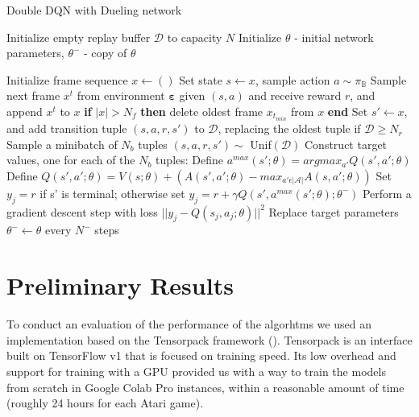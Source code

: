 \documentclass{article}
\begin{document}
\begin{algorithm}[ht]
\caption{Double DQN with Dueling network}\label{alg:double}
\begin{algorithmic}[2]
    \State Initialize empty replay buffer $\mathcal{D}$ to capacity $N$
    \State Initialize $\theta$ - initial network parameters, $\theta^{-}$ - copy of $\theta$

        \State Initialize frame sequence $x \gets ()$ 
            \State Set state $s \gets x$, sample action $a \sim \pi_{\mathbb{B}}$
            \State Sample next frame $x^{t}$ from environment $\mathbf{\varepsilon}$
            given $(s,a)$ and receive reward $r$, and append $x^{t}$ to $x$
            \State \textbf{if} $\vert x \vert > N_{f}$ \textbf{then} delete oldest frame
            $x_{t_{min}}$ from $x$ \textbf{end}
            \State Set $s' \gets x$, and add transition tuple $(s, a, r, s')$
            to $\mathcal{D}$, 
            \State \indent replacing the oldest tuple if $\mathcal{D} \geq N_{r}$
            \State Sample a  minibatch of $N_{b}$ tuples $(s, a, r, s') \sim$
            Unif$(\mathcal{D})$
            \State Construct target values, one for each of the $N_{b}$ tuples:
            \State Define $a^{max}(s';\theta) = argmax_{a'}Q(s', a'; \theta)$
            \State Define $Q(s', a'; \theta)=V(s; \theta) + (A(s', a'; \theta)
            - max_{a' \epsilon \vert \mathcal{A} \vert} A(s, a'; \theta))$
            \State Set $y_{j} = r$ if s' is terminal; otherwise set
            $y_{j} = r + \gamma Q(s', a^{max}(s';\theta); \theta^{-})$
            \State Perform a gradient descent step with loss $\vert \vert y_j - Q(s_j, a_j; \theta) \vert \vert ^2$ 
            \State Replace target parameters $\theta^{-} \gets \theta$ every $N^{-}$ steps 
        \EndFor
    \EndFor
\end{algorithmic}


\end{algorithm}



\section{Preliminary Results}
To conduct an evaluation of the performance of the algorhtms we used an
implementation based on the Tensorpack framework (\cite{wu2016tensorpack}).
Tensorpack is an interface built on TensorFlow v1 that is focused on training
speed. Its low overhead and support for training with a GPU provided us with a
way to train the models from scratch in Google Colab Pro instances, within a
reasonable amount of time (roughly 24 hours for each Atari game).
\end{document}
